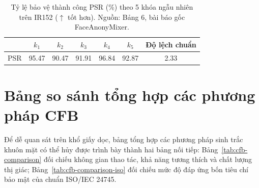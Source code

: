 \documentclass[oneside,a4paper,12pt]{extarticle}
\begin{document}
\begin{table}[H]
\centering
\small
\setlength{\tabcolsep}{6pt}
\caption[Tỷ lệ bảo vệ thành công PSR theo 5 khóa ngẫu nhiên trên IR152]{Tỷ lệ bảo vệ thành công PSR (\%) theo 5 khóa ngẫu nhiên trên IR152 ($\uparrow$ tốt hơn). Nguồn: Bảng 6, bài báo gốc FaceAnonyMixer.}
\label{tab:key_robustness}
\begin{tabular}{|c|ccccc|c|}
\hline
 & $k_1$ & $k_2$ & $k_3$ & $k_4$ & $k_5$ & \textbf{Độ lệch chuẩn} \\
\hline
PSR & 95.47 & 90.47 & 91.91 & 96.84 & 92.87 & 2.33 \\
\hline
\end{tabular}
\end{table}

\clearpage
\section{Bảng so sánh tổng hợp các phương pháp CFB}
\label{sec:cfb-comparison}

Để dễ quan sát trên khổ giấy dọc, bảng tổng hợp các phương pháp sinh trắc khuôn mặt có thể hủy được trình bày thành hai bảng nối tiếp: Bảng~\ref{tab:cfb-comparison} đối chiếu không gian thao tác, khả năng tương thích và chất lượng thị giác; Bảng~\ref{tab:cfb-comparison-iso} đối chiếu mức độ đáp ứng bốn tiêu chí bảo mật của chuẩn ISO/IEC 24745.
\end{document}
